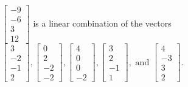 \begin{exercise}
\begin{exerciseStatement}
  \end{exerciseStatement}
  \begin{exerciseAnswer}
   \(\left[\begin{array}{c}
-9 \\
-6 \\
3 \\
12
\end{array}\right]\) 
  	 is  
	a linear combination of the vectors \(\left[\begin{array}{c}
3 \\
-2 \\
-1 \\
2
\end{array}\right] , \left[\begin{array}{c}
0 \\
2 \\
-2 \\
-2
\end{array}\right] , \left[\begin{array}{c}
4 \\
0 \\
0 \\
-2
\end{array}\right] , \left[\begin{array}{c}
3 \\
2 \\
-1 \\
1
\end{array}\right] , \text{ and } \left[\begin{array}{c}
4 \\
-3 \\
3 \\
2
\end{array}\right]\).

	
  


  \end{exerciseAnswer}
\end{exercise}